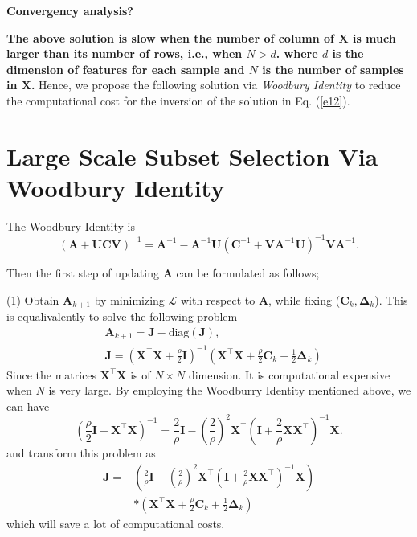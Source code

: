 \documentclass[10pt,twocolumn,letterpaper]{article}
\begin{document}
\textbf{Convergency analysis?}



\textbf{The above solution is slow when the number of column of $\bm{X}$ is much larger than its number of rows, i.e., when $N>d$. where $d$ is the dimension of features for each sample and $N$ is the number of samples in $\bm{X}$.} Hence, we propose the following solution via \textsl{Woodbury Identity} to reduce the computational cost for the inversion of the solution in Eq. (\ref{e12}).


\section{Large Scale Subset Selection Via Woodbury Identity}

The Woodbury Identity is 
\begin{equation}
(
\bm{A}
+
\bm{U}
\bm{C}
\bm{V}
)^{-1}
=
\bm{A}^{-1}
-
\bm{A}^{-1}
\bm{U}
(
\bm{C}^{-1}
+
\bm{V}\bm{A}^{-1}\bm{U}
)^{-1}
\bm{V}\bm{A}^{-1}
.
\end{equation}

Then the first step of updating $\bm{A}$ can be formulated as follows;

(1) Obtain $\bm{A}_{k+1}$ by minimizing $\mathcal{L}$ with respect to $\bm{A}$, while fixing ($\bm{C}_{k},\bm{\Delta}_{k}$). This is equalivalently to solve the following problem
\begin{equation}
\begin{split}
\label{e18}
&
\bm{A}_{k+1}
=
\bm{J}-\text{diag}(\bm{J}),
\\
&
\bm{J}
=
(\bm{X}^{\top}\bm{X}+\frac{\rho}{2}\bm{I})^{-1}
(\bm{X}^{\top}\bm{X}
+
\frac{\rho}{2}
\bm{C}_{k}
+
\frac{1}{2}
\bm{\Delta}_{k}
)
\end{split}
\end{equation}
Since the matrices $\bm{X}^{\top}\bm{X}$ is of $N\times N$ dimension. It is computational expensive when $N$ is very large. By employing the Woodburry Identity mentioned above, we can have 
\begin{equation}
\label{e19}
(
\frac{\rho}{2}\bm{I}
+
\bm{X}^{\top}\bm{X}
)^{-1}
=
\frac{2}{\rho}\bm{I}
-
(\frac{2}{\rho})^{2}
\bm{X}^{\top}
(
\bm{I}
+
\frac{2}{\rho}\bm{X}\bm{X}^{\top}
)^{-1}
\bm{X}
.
\end{equation}
and transform this problem as
\begin{equation}
\begin{split}
\label{e20}
\bm{J}
=
&
(
\frac{2}{\rho}\bm{I}
-
(\frac{2}{\rho})^{2}
\bm{X}^{\top}
(
\bm{I}
+
\frac{2}{\rho}\bm{X}\bm{X}^{\top}
)^{-1}
\bm{X}
)
\\
&
*
(\bm{X}^{\top}\bm{X}
+
\frac{\rho}{2}
\bm{C}_{k}
+
\frac{1}{2}
\bm{\Delta}_{k}
)
\end{split}
\end{equation}
which will save a lot of computational costs.
\end{document}
